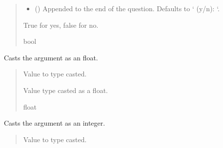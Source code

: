 \documentclass[letterpaper,10pt,english]{sphinxmanual}
\begin{document}
\begin{fulllineitems}
\begin{fulllineitems}
\begin{quote}
\begin{description}
\begin{itemize}
\item {} 
\sphinxAtStartPar
{} (\sphinxstyleliteralemphasis{\sphinxupquote{, }}) \textendash{} Appended to the end of the question. Defaults to ‘ (y/n): ‘.

\end{itemize}

\sphinxAtStartPar
True for yes, false for no.

\sphinxAtStartPar
bool

\end{description}\end{quote}

\end{fulllineitems}


\begin{fulllineitems}
\label{\detokenize{GetUserInput:GetUserInput.UserInput.CastFloat}}
\pysigstartsignatures
{}
\pysigstopsignatures
\sphinxAtStartPar
Casts the argument as an float.
\begin{quote}\begin{description}
\sphinxAtStartPar
{} \textendash{} Value to type casted.

\sphinxAtStartPar
Value type casted as a float.

\sphinxAtStartPar
float

\end{description}\end{quote}

\end{fulllineitems}


\begin{fulllineitems}
\label{\detokenize{GetUserInput:GetUserInput.UserInput.CastInt}}
\pysigstartsignatures
{}
\pysigstopsignatures
\sphinxAtStartPar
Casts the argument as an integer.
\begin{quote}\begin{description}
\sphinxAtStartPar
{} \textendash{} Value to type casted.


\end{description}
\end{quote}
\end{fulllineitems}
\end{fulllineitems}
\end{document}
